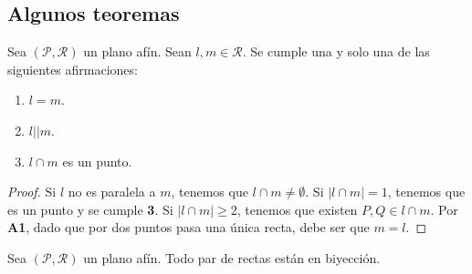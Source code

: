 \subsection{Algunos teoremas}
\begin{lema}[Tricotomía]
Sea $\displaystyle \left(\mathcal{P}, \mathcal{R}\right) $ un plano afín. Sean $\displaystyle l, m \in \mathcal{R} $. Se cumple una y solo una de las siguientes afirmaciones:
\begin{enumerate}
\item $\displaystyle l = m $.
\item $\displaystyle l | | m $.
\item $\displaystyle l \cap m $ es un punto.
\end{enumerate}
\end{lema}
\begin{proof}
Si $\displaystyle l $ no es paralela a $\displaystyle m $, tenemos que $\displaystyle l \cap m \neq \emptyset $. Si $\displaystyle \left|l \cap m\right| = 1 $, tenemos que es un punto y se cumple \textbf{3}. Si $\displaystyle \left|l \cap m\right|\geq 2 $, tenemos que existen $\displaystyle P,Q \in l \cap m $. Por \textbf{A1}, dado que por dos puntos pasa una única recta, debe ser que $\displaystyle m = l $.
\end{proof}
\begin{theorem}
Sea $\displaystyle \left(\mathcal{P}, \mathcal{R}\right) $ un plano afín. Todo par de rectas están en biyección.
\end{theorem}
